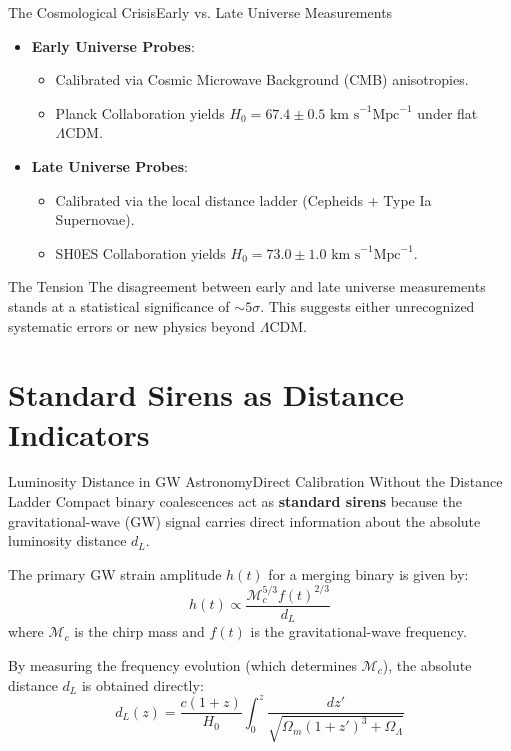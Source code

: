 \documentclass[11pt,aspectratio=169]{beamer}
\begin{document}
\begin{frame}{The Cosmological Crisis}{Early vs. Late Universe Measurements}
  \begin{itemize}
    \item \textbf{Early Universe Probes}:
    \begin{itemize}
      \item Calibrated via Cosmic Microwave Background (CMB) anisotropies.
      \item Planck Collaboration yields $H_0 = 67.4 \pm 0.5 \text{ km s}^{-1}\text{Mpc}^{-1}$ under flat $\Lambda\text{CDM}$.
    \end{itemize}
    \vspace{0.5em}
    \item \textbf{Late Universe Probes}:
    \begin{itemize}
      \item Calibrated via the local distance ladder (Cepheids + Type Ia Supernovae).
      \item SH0ES Collaboration yields $H_0 = 73.0 \pm 1.0 \text{ km s}^{-1}\text{Mpc}^{-1}$.
    \end{itemize}
  \end{itemize}
  \vspace{0.8em}
  \begin{block}{The Tension}
    The disagreement between early and late universe measurements stands at a statistical significance of $\sim 5\sigma$. This suggests either unrecognized systematic errors or new physics beyond $\Lambda\text{CDM}$.
  \end{block}
\end{frame}

\section{Standard Sirens as Distance Indicators}

\begin{frame}{Luminosity Distance in GW Astronomy}{Direct Calibration Without the Distance Ladder}
  Compact binary coalescences act as \textbf{standard sirens} because the gravitational-wave (GW) signal carries direct information about the absolute luminosity distance $d_L$.
  
  \vspace{0.3cm}
  The primary GW strain amplitude $h(t)$ for a merging binary is given by:
  \begin{equation}
    h(t) \propto \frac{\mathcal{M}_c^{5/3} f(t)^{2/3}}{d_L}
  \end{equation}
  where $\mathcal{M}_c$ is the chirp mass and $f(t)$ is the gravitational-wave frequency.
  
  \vspace{0.3cm}
  By measuring the frequency evolution (which determines $\mathcal{M}_c$), the absolute distance $d_L$ is obtained directly:
  \begin{equation}
    d_L(z) = \frac{c(1+z)}{H_0} \int_0^z \frac{dz'}{\sqrt{\Omega_m(1+z')^3 + \Omega_\Lambda}}
  \end{equation}
\end{frame}
\end{document}
